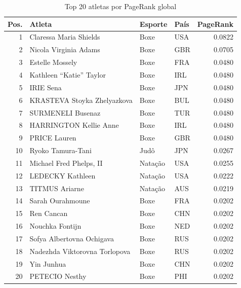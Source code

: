 \begin{table}[htbp]
\caption{Top 20 atletas por PageRank global}
\label{tab:top20_pagerank}
\centering
\footnotesize
\begin{tabular}{rp{6cm}llr}
\toprule
\textbf{Pos.} & \textbf{Atleta} & \textbf{Esporte} & \textbf{País} & \textbf{PageRank} \\
\midrule
1 & Claressa Maria Shields & Boxe & USA & 0.0822 \\
2 & Nicola Virginia Adams & Boxe & GBR & 0.0705 \\
3 & Estelle Mossely & Boxe & FRA & 0.0480 \\
4 & Kathleen ``Katie'' Taylor & Boxe & IRL & 0.0480 \\
5 & IRIE Sena & Boxe & JPN & 0.0480 \\
6 & KRASTEVA Stoyka Zhelyazkova & Boxe & BUL & 0.0480 \\
7 & SURMENELI Busenaz & Boxe & TUR & 0.0480 \\
8 & HARRINGTON Kellie Anne & Boxe & IRL & 0.0480 \\
9 & PRICE Lauren & Boxe & GBR & 0.0480 \\
10 & Ryoko Tamura-Tani & Judô & JPN & 0.0267 \\
11 & Michael Fred Phelps, II & Natação & USA & 0.0255 \\
12 & LEDECKY Kathleen & Natação & USA & 0.0222 \\
13 & TITMUS Ariarne & Natação & AUS & 0.0219 \\
14 & Sarah Ourahmoune & Boxe & FRA & 0.0202 \\
15 & Ren Cancan & Boxe & CHN & 0.0202 \\
16 & Nouchka Fontijn & Boxe & NED & 0.0202 \\
17 & Sofya Albertovna Ochigava & Boxe & RUS & 0.0202 \\
18 & Nadezhda Viktorovna Torlopova & Boxe & RUS & 0.0202 \\
19 & Yin Junhua & Boxe & CHN & 0.0202 \\
20 & PETECIO Nesthy & Boxe & PHI & 0.0202 \\
\bottomrule
\end{tabular}
\end{table}

